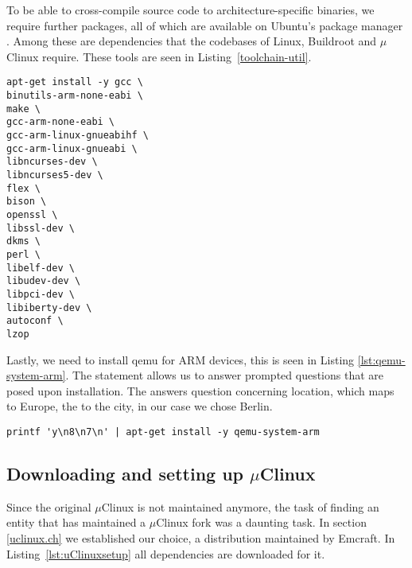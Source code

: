 To be able to cross-compile source code to architecture-specific binaries, we require further packages, all of which are available on Ubuntu's package manager . Among these are dependencies that the codebases of Linux, Buildroot and $\mu$Clinux require. These tools are seen in Listing~\ref{toolchain-util}.

\begin{lstlisting}[style=SH, caption=Installing toolchains and dependencies, label=toolchain-util, float, floatplacement=H]
apt-get install -y gcc \
binutils-arm-none-eabi \
make \
gcc-arm-none-eabi \
gcc-arm-linux-gnueabihf \
gcc-arm-linux-gnueabi \
libncurses-dev \
libncurses5-dev \
flex \
bison \
openssl \
libssl-dev \
dkms \
perl \
libelf-dev \
libudev-dev \
libpci-dev \
libiberty-dev \
autoconf \
lzop 
\end{lstlisting}

Lastly, we need to install qemu for ARM devices, this is seen in Listing \ref{lst:qemu-system-arm}. The  statement allows us to answer prompted questions that are posed upon installation. The  answers question concerning location, which maps to Europe, the  to the city, in our case we chose Berlin.

\begin{lstlisting}[style=SH, caption=Installing QEMU in the container, label=lst:qemu-system-arm]
printf 'y\n8\n7\n' | apt-get install -y qemu-system-arm
\end{lstlisting}

\subsection{Downloading and setting up $\mu$Clinux}

Since the original $\mu$Clinux is not maintained anymore, the task of finding an entity that has maintained a $\mu$Clinux fork was a daunting task. In section \ref{uclinux.ch} we established our choice, a distribution maintained by Emcraft. In Listing~\ref{lst:uClinuxsetup} all dependencies are downloaded for it.

